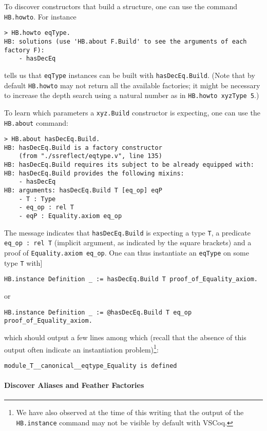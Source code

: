 \documentclass{article}
\def\coqin#1{\texttt{#1}}
\begin{document}
To discover constructors that build a structure, one can use the command
\coqin{HB.howto}. For instance
\begin{verbatim}
> HB.howto eqType.
HB: solutions (use 'HB.about F.Build' to see the arguments of each factory F):
    - hasDecEq
\end{verbatim}
tells us that \coqin{eqType} instances can be built with \coqin{hasDecEq.Build}.
(Note that by default \coqin{HB.howto} may not return all the available factories;
it might be necessary to increase the depth search using a natural number
as in \coqin{HB.howto xyzType 5}.)

To learn which parameters a \coqin{xyz.Build} constructor is expecting, one
can use the \coqin{HB.about} command:
\begin{verbatim}
> HB.about hasDecEq.Build.
HB: hasDecEq.Build is a factory constructor
    (from "./ssreflect/eqtype.v", line 135)
HB: hasDecEq.Build requires its subject to be already equipped with:
HB: hasDecEq.Build provides the following mixins:
    - hasDecEq
HB: arguments: hasDecEq.Build T [eq_op] eqP
    - T : Type
    - eq_op : rel T
    - eqP : Equality.axiom eq_op
\end{verbatim}
The message indicates that \coqin{hasDecEq.Build} is expecting a type
\coqin{T}, a predicate \coqin{eq_op : rel T} (implicit argument,
as indicated by the square brackets) and a proof of \coqin{Equality.axiom eq_op}.
One can thus instantiate an \coqin{eqType} on some type \coqin{T} with]
\begin{verbatim}
HB.instance Definition _ := hasDecEq.Build T proof_of_Equality_axiom.
\end{verbatim}
or
\begin{verbatim}
HB.instance Definition _ := @hasDecEq.Build T eq_op proof_of_Equality_axiom.
\end{verbatim}
which should output a few lines among which (recall that the absence
of this output often indicate an instantiation problem)\footnote{We
  have also observed at the time of this writing that the output of
  the \coqin{HB.instance} command may not be visible by default with
  VSCoq.}:
\begin{verbatim}
module_T__canonical__eqtype_Equality is defined
\end{verbatim}

\paragraph{Discover Aliases and Feather Factories}
\end{document}
